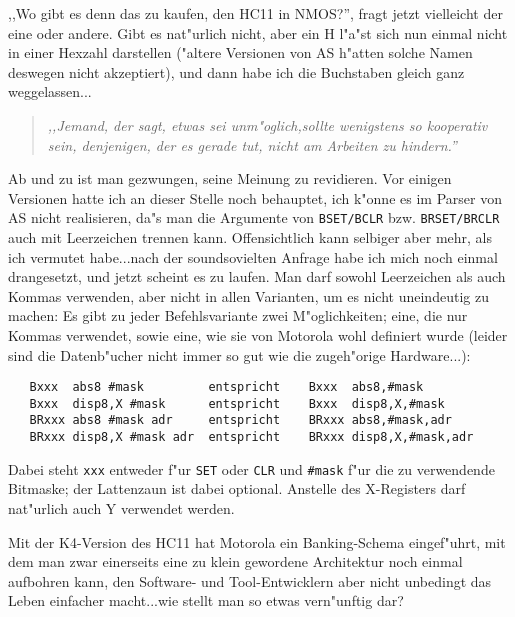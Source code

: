 \documentclass[12pt,a4paper,twoside]{report}
\newcommand{\tty}[1]{{\tt #1}}
\begin{document}
{,,Wo gibt es denn das zu kaufen, den HC11 in NMOS?'', fragt jetzt vielleicht
der eine oder andere.  Gibt es nat"urlich nicht, aber ein H l"a"st sich nun
einmal nicht in einer Hexzahl darstellen ("altere Versionen von AS h"atten
solche Namen deswegen nicht akzeptiert), und dann habe ich die Buchstaben
gleich ganz weggelassen...
\par
\begin{quote}{\it
,,Jemand, der sagt, etwas sei unm"oglich,sollte wenigstens so kooperativ
sein, denjenigen, der es gerade tut, nicht am Arbeiten zu hindern.''
}\end{quote}
Ab und zu ist man gezwungen, seine Meinung zu revidieren.  Vor einigen
Versionen hatte ich an dieser Stelle noch behauptet, ich k"onne es im Parser
von AS nicht realisieren, da"s man die Argumente von \tty{BSET/BCLR} bzw.
\tty{BRSET/BRCLR} auch mit Leerzeichen trennen kann.  Offensichtlich kann
selbiger aber mehr, als ich vermutet habe...nach der soundsovielten Anfrage
habe ich mich noch einmal drangesetzt, und jetzt scheint es zu laufen.  Man
darf sowohl Leerzeichen als auch Kommas verwenden, aber nicht in allen
Varianten, um es nicht uneindeutig zu machen:  Es gibt zu jeder
Befehlsvariante zwei M"oglichkeiten; eine, die nur Kommas verwendet, sowie
eine, wie sie von Motorola wohl definiert wurde (leider sind die Datenb"ucher
nicht immer so gut wie die zugeh"orige Hardware...):
\begin{verbatim}
   Bxxx  abs8 #mask         entspricht    Bxxx  abs8,#mask
   Bxxx  disp8,X #mask      entspricht    Bxxx  disp8,X,#mask
   BRxxx abs8 #mask adr     entspricht    BRxxx abs8,#mask,adr
   BRxxx disp8,X #mask adr  entspricht    BRxxx disp8,X,#mask,adr
\end{verbatim}
Dabei steht \tty{xxx} entweder f"ur \tty{SET} oder \tty{CLR} und \tty{\#mask}
f"ur die zu verwendende Bitmaske; der Lattenzaun ist dabei optional.
Anstelle des X-Registers darf nat"urlich auch Y verwendet werden.

Mit der K4-Version des HC11 hat Motorola ein Banking-Schema eingef"uhrt,
mit dem man zwar einerseits eine zu klein gewordene Architektur noch
einmal aufbohren kann, den Software- und Tool-Entwicklern aber nicht
unbedingt das Leben einfacher macht...wie stellt man so etwas vern"unftig
dar?

}
\end{document}
